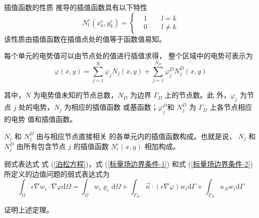 \begin{theorem}{插值函数的性质}
    推导的插值函数具有以下特性
    \begin{equation}
        N_l^e(x^e_k,y^e_k)
        =\left\{
            \begin{aligned}
                &1\qquad l=k\\
                &0\qquad l\neq k
            \end{aligned}
        \right.
    \end{equation}
    该性质由插值函数在插值点处的值等于函数值易知。
\end{theorem}

\par 每个单元的电势值可以由节点处的值进行插值求得，
整个区域中的电势可表示为
\begin{equation}
    \varphi(x,y)=\sum_{j=1}^{N} \varphi_j N_j(x,y)
    +\sum_{j=1}^{N_D} \varphi_{j}^D N_{j}^D(x,y)
\end{equation}
\par 其中，$N$ 为电势值未知的节点总数，$N_D$ 为边界
$\Gamma_D$ 上的节点数。此
外，$\varphi_j$ 为节点 $j$ 处的电势，$N_j$ 为相应的插值函数
或基函数；$\varphi_j^D$和 $N_j^D$ 为 $\Gamma_D$ 上各节点相应的电势
值和插值函数。

\begin{note}
    $N_j$ 和 $N_j^D$ 由与相应节点直接相关
    的各单元内的插值函数构成。也就是说，
    $N_j$ 和 $N_j^D$ 由所有包含节点 $j$ 的插值函数 $N_l^e(x,y)$ 相加构成。
\end{note}

\begin{theorem}{弱式表达式}
    式 (\ref{泊松方程})，式 (\ref{标量场边界条件-1}) 和式
    (\ref{标量场边界条件-2}) 所定义的边值问题的弱式表达式为
    \begin{equation}
        \int_{\Omega}\epsilon\nabla w_i\cdot\nabla \varphi\text{d}\Omega
        =\int_{\Omega}w_i\varrho_e\text{d}\Omega
        +\int_{\Gamma_D}\vec{n}\cdot(\epsilon\nabla\varphi)w_i\text{d}\Gamma
        +\int_{\Gamma_N}\kappa_N w_i\text{d}\Gamma
    \end{equation}
\end{theorem}

\begin{exercise}
    证明上述定理。
\end{exercise}

